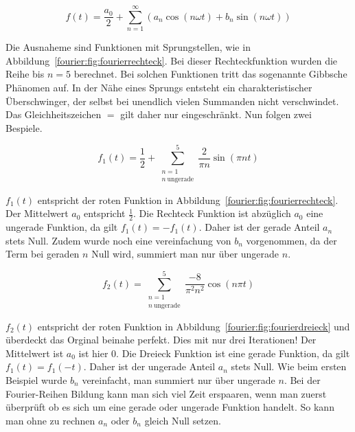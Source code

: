 \begin{equation}
f(t) = \frac{a_0}{2} + \sum_{n=1}^{\infty} \left( a_n \cos\left( n\omega t \right) + b_n \sin\left( n \omega t \right) \right)
\end{equation}


Die Ausnaheme sind Funktionen mit Sprungstellen, wie in Abbildung~\ref{fourier:fig:fourierrechteck}.
Bei dieser Rechteckfunktion wurden die Reihe bis $n = 5$ berechnet.
Bei solchen Funktionen tritt das sogenannte Gibbsche Phänomen auf.
In der Nähe eines Sprungs entsteht ein charakteristischer Überschwinger, der selbst bei unendlich vielen Summanden nicht verschwindet.
Das Gleichheitszeichen $=$ gilt daher nur eingeschränkt. 
Nun folgen zwei Bespiele.



\begin{equation}
	f_1(t) = \frac{1}{2} + \sum_{\substack{n=1 \\ n\ \text{ungerade}}}^{5} \frac{2}{\pi n} \sin\left( \pi n t \right)
\end{equation}

$f_1(t)$ entspricht der roten Funktion in Abbildung~\ref{fourier:fig:fourierrechteck}. 
Der Mittelwert $a_0$ entspricht $\frac{1}{2}$. 
Die Rechteck Funktion ist abzüglich $a_0$ eine ungerade Funktion, da gilt $f_1(t) = -f_1(t)$. 
Daher ist der gerade Anteil $a_n$ stets Null. 
Zudem wurde noch eine vereinfachung von $b_n$ vorgenommen, da der Term bei geraden $n$ Null wird, summiert man nur über ungerade $n$. 





\begin{equation}
	f_2(t) = \sum_{\substack{n=1 \\ n\ \text{ungerade}}}^{5} \frac{-8}{\pi^2 n^2} \cos(n\pi t)
\end{equation}

$f_2(t)$ entspricht der roten Funktion in Abbildung~\ref{fourier:fig:fourierdreieck} und überdeckt das Orginal beinahe perfekt. 
Dies mit nur drei Iterationen!
Der Mittelwert ist $a_0$ ist hier 0. 
Die Dreieck Funktion ist eine gerade Funktion, da gilt $f_1(t) = f_1(-t)$. 
Daher ist der ungerade Anteil $a_n$ stets Null. 
Wie beim ersten Beispiel wurde $b_n$ vereinfacht, man summiert nur über ungerade $n$. 
Bei der Fourier-Reihen Bildung kann man sich viel Zeit erspaaren, wenn man zuerst überprüft ob es sich um eine gerade oder ungerade Funktion handelt.
So kann man ohne zu rechnen $a_n$ oder $b_n$ gleich Null setzen.




